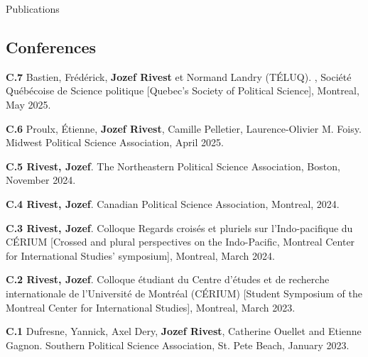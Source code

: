 \documentclass{resume} %
\begin{document}
\begin{rSection}{Publications}
\subsection*{Conferences}

{\textbf{C.7} Bastien, Frédérick, \textbf{Jozef Rivest} et Normand Landry (TÉLUQ). , Société Québécoise de Science politique [Quebec's Society of Political Science], Montreal, May 2025.}

{\textbf{C.6} Proulx, Étienne, \textbf{Jozef Rivest}, Camille Pelletier, Laurence-Olivier M. Foisy.  Midwest Political Science Association, April 2025.}

{\textbf{C.5 Rivest, Jozef}.  The Northeastern Political Science Association, Boston, November 2024.}

{\textbf{C.4 Rivest, Jozef}.  Canadian Political Science Association, Montreal, 2024.}

{\textbf{C.3 Rivest, Jozef}.  Colloque Regards croisés et pluriels sur l'Indo-pacifique du CÉRIUM [Crossed and plural perspectives on the Indo-Pacific, Montreal Center for International Studies' symposium], Montreal, March 2024.}

{\textbf{C.2 Rivest, Jozef}.  Colloque étudiant du Centre d’études et de recherche internationale de l’Université de Montréal (CÉRIUM) [Student Symposium of the Montreal Center for International Studies], Montreal, March 2023.} \par

{\textbf{C.1} Dufresne, Yannick, Axel Dery, \textbf{Jozef Rivest}, Catherine Ouellet and Etienne Gagnon.  Southern Political Science Association, St. Pete Beach, January 2023.}


\end{rSection}
\end{document}
